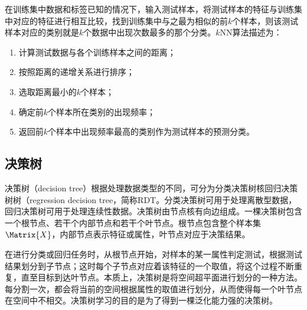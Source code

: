 在训练集中数据和标签已知的情况下，输入测试样本，将测试样本的特征与训练集中对应的特征进行相互比较，找到训练集中与之最为相似的前$k$个样本，则该测试样本对应的类别就是$k$个数据中出现次数最多的那个分类。$k$NN算法描述为：
\begin{enumerate}
\item 计算测试数据与各个训练样本之间的距离；
\item 按照距离的递增关系进行排序；
\item 选取距离最小的$k$个样本；
\item 确定前$k$个样本所在类别的出现频率；
\item 返回前$k$个样本中出现频率最高的类别作为测试样本的预测分类。
\end{enumerate}

\subsection{决策树}\label{sec:决策树}

决策树（decision tree）根据处理数据类型的不同，可分为分类决策树核回归决策树树（regression decision tree，简称RDT。分类决策树可用于处理离散型数据，回归决策树可用于处理连续性数据。决策树由节点核有向边组成。一棵决策树包含一个根节点、若干个内部节点和若干个叶节点。根节点包含整个样本集$\Matrix{X}$，内部节点表示特征或属性，叶节点对应于决策结果。

在进行分类或回归任务时，从根节点开始，对样本的某一属性判定测试，根据测试结果划分到子节点；这时每个子节点对应着该特征的一个取值，将这个过程不断重复，直至目标到达叶节点。本质上，决策树是将空间超平面进行划分的一种方法。每分割一次，都会将当前的空间根据属性的取值进行划分，从而使得每一个叶节点在空间中不相交。决策树学习的目的是为了得到一棵泛化能力强的决策树。

